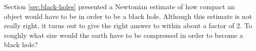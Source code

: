 Section \ref{sec:black-holes} presented a Newtonian estimate of how compact an object would have to be
in order to be a black hole. Although this estimate is not really right, it turns out to give the right
answer to within about a factor of 2. To roughly what size would the earth have to be compressed in order to become
a black hole?
